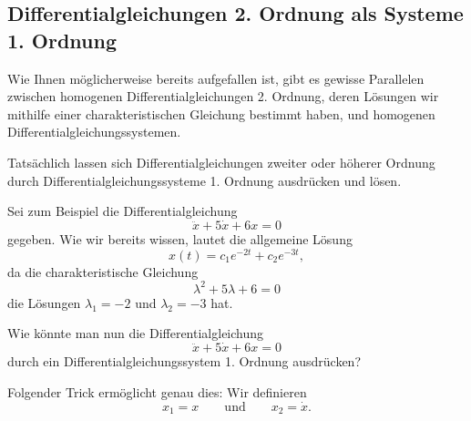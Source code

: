 

























\clearpage
\subsection{Differentialgleichungen 2. Ordnung als Systeme 1. Ordnung}

Wie Ihnen möglicherweise bereits aufgefallen ist, gibt es gewisse Parallelen zwischen homogenen Differentialgleichungen 2. Ordnung, deren Lösungen wir mithilfe einer charakteristischen Gleichung bestimmt haben, und homogenen Differentialgleichungssystemen.

Tatsächlich lassen sich Differentialgleichungen zweiter oder höherer Ordnung durch Differentialgleichungssysteme 1. Ordnung ausdrücken und lösen.

Sei zum Beispiel die Differentialgleichung
\[
    \ddot{x}+5\dot{x}+6x=0
\]
gegeben. Wie wir bereits wissen, lautet die allgemeine Lösung
\[
    x(t)=c_1e^{-2t}+c_2e^{-3t},
\]
da die charakteristische Gleichung
\[
    \lambda^2+5\lambda+6=0
\]
die Lösungen \(\lambda_1=-2\) und \(\lambda_2=-3\) hat.

Wie könnte man nun die Differentialgleichung
\[
    \ddot{x}+5\dot{x}+6x=0
\]
durch ein Differentialgleichungssystem 1. Ordnung ausdrücken?

Folgender Trick ermöglicht genau dies:
Wir definieren
\[
    x_1=x
    \qquad\text{und}\qquad
    x_2=\dot{x}.
\]


